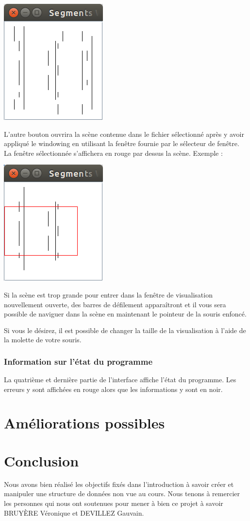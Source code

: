 \documentclass[10pt,a4paper]{article}
\begin{document}
\centerline{\includegraphics[scale=0.5]{images/ui_whole_scene.png}}

L'autre bouton ouvrira la scène contenue dans le fichier sélectionné après y avoir appliqué le windowing en utilisant la fenêtre fournie par le sélecteur de fenêtre. La fenêtre sélectionnée s'affichera en rouge par dessus la scène. Exemple :

\centerline{\includegraphics[scale=0.5]{images/ui_restricted_window.png}}

Si la scène est trop grande pour entrer dans la fenêtre de visualisation nouvellement ouverte, des barres de défilement apparaîtront et il vous sera possible de naviguer dans la scène en maintenant le pointeur de la souris enfoncé.

Si vous le désirez, il est possible de changer la taille de la visualisation à l'aide de la molette de votre souris.

\subsubsection{Information sur l'état du programme}
La quatrième et dernière partie de l'interface affiche l'état du programme. Les erreurs y sont affichées en rouge alors que les informations y sont en noir.

\section{Améliorations possibles}


\section{Conclusion}
Nous avons bien réalisé les objectifs fixés dans l'introduction à savoir créer et manipuler une structure de données non vue au cours. Nous tenons à remercier les personnes qui nous ont soutenues pour mener à bien ce projet à savoir BRUYÈRE Véronique et DEVILLEZ Gauvain.
\end{document}
